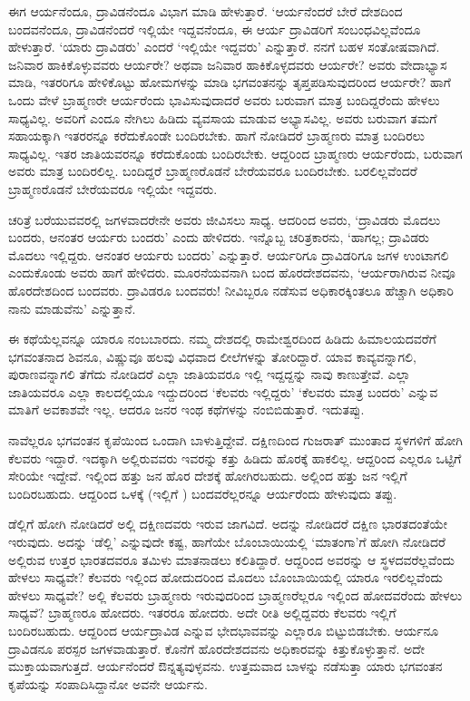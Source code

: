 ಈಗ ಆರ್ಯನೆಂದೂ, ದ್ರಾವಿಡನೆಂದೂ ವಿಭಾಗ ಮಾಡಿ ಹೇಳುತ್ತಾರೆ. `ಆರ್ಯನೆಂದರೆ ಬೇರೆ ದೇಶದಿಂದ ಬಂದವನೆಂದೂ, ದ್ರಾವಿಡನೆಂದರೆ ಇಲ್ಲಿಯೇ ಇದ್ದವನೆಂದೂ, ಈ ಆರ್ಯ ದ್ರಾವಿಡರಿಗೆ ಸಂಬಂಧವಿಲ್ಲವೆಂದೂ ಹೇಳುತ್ತಾರೆ. `ಯಾರು ದ್ರಾವಿಡರು' ಎಂದರೆ  `ಇಲ್ಲಿಯೇ ಇದ್ದವರು'  ಎನ್ನುತ್ತಾರೆ. ನನಗೆ ಬಹಳ ಸಂತೋಷವಾಗಿದೆ. ಜನಿವಾರ ಹಾಕಿಕೊಳ್ಳುವವರು ಆರ್ಯರೇ? ಅಥವಾ ಜನಿವಾರ ಹಾಕಿಕೊಳ್ಳದವರು ಆರ್ಯರೇ? ಅವರು ವೇದಾಭ್ಯಾಸ ಮಾಡಿ, ಇತರರಿಗೂ ಹೇಳಿಕೊಟ್ಟು ಹೋಮಗಳನ್ನು ಮಾಡಿ ಭಗವಂತನನ್ನು ತೃಪ್ತಪಡಿಸುವುದರಿಂದ ಆರ್ಯರೇ? ಹಾಗೆ ಒಂದು ವೇಳೆ ಬ್ರಾಹ್ಮಣರೇ ಆರ್ಯರೆಂದು ಭಾವಿಸುವುದಾದರೆ ಅವರು ಬರುವಾಗ ಮಾತ್ರ ಬಂದಿದ್ದರೆಂದು ಹೇಳಲು ಸಾಧ್ಯವಿಲ್ಲ. ಅವರಿಗೆ ಎಂದೂ ನೇಗಿಲು ಹಿಡಿದು ವ್ಯವಸಾಯ ಮಾಡುವ ಅಭ್ಯಾಸವಿಲ್ಲ. ಅವರು ಬರುವಾಗ ತಮಗೆ ಸಹಾಯಕ್ಕಾಗಿ ಇತರರನ್ನೂ ಕರೆದುಕೊಂಡೇ ಬಂದಿರಬೇಕು. ಹಾಗೆ ನೋಡಿದರೆ ಬ್ರಾಹ್ಮಣರು ಮಾತ್ರ ಬಂದಿರಲು ಸಾಧ್ಯವಿಲ್ಲ. ಇತರ ಜಾತಿಯವರನ್ನೂ ಕರೆದುಕೊಂಡು ಬಂದಿರಬೇಕು. ಆದ್ದರಿಂದ ಬ್ರಾಹ್ಮಣರು ಆರ್ಯರೆಂದು, ಬರುವಾಗ ಅವರು ಮಾತ್ರ ಬಂದಿರಲಿಲ್ಲ. ಬಂದಿದ್ದರೆ ಬ್ರಾಹ್ಮಣರೊಡನೆ ಬೇರೆಯವರೂ ಬಂದಿರಬೇಕು. ಬರಲಿಲ್ಲವೆಂದರೆ ಬ್ರಾಹ್ಮಣರೊಡನೆ ಬೇರೆಯವರೂ ಇಲ್ಲಿಯೇ ಇದ್ದವರು.

ಚರಿತ್ರೆ ಬರೆಯುವವರಲ್ಲಿ ಜಗಳವಾದರೇನೇ ಅವರು ಜೀವಿಸಲು ಸಾಧ್ಯ. ಆದರಿಂದ ಅವರು, `ದ್ರಾವಿಡರು ಮೊದಲು ಬಂದರು, ಆನಂತರ ಆರ್ಯರು ಬಂದರು' ಎಂದು ಹೇಳಿದರು. ಇನ್ನೊಬ್ಬ ಚರಿತ್ರಕಾರನು, `ಹಾಗಲ್ಲ; ದ್ರಾವಿಡರು ಮೊದಲು ಇಲ್ಲಿದ್ದರು. ಆನಂತರ ಆರ್ಯರು ಬಂದರು' ಎನ್ನುತ್ತಾರೆ. ಆರ್ಯರಿಗೂ ದ್ರಾವಿಡರಿಗೂ ಜಗಳ ಉಂಟಾಗಲಿ ಎಂದುಕೊಂಡು ಅವರು ಹಾಗೆ ಹೇಳಿದರು. ಮೂರನೆಯವನಾಗಿ ಬಂದ ಹೊರದೇಶದವನು, `ಆರ್ಯರಾಗಿರುವ ನೀವೂ ಹೊರದೇಶದಿಂದ ಬಂದವರು. ದ್ರಾವಿಡರೂ ಬಂದವರು! ನೀವಿಬ್ಬರೂ ನಡೆಸುವ ಅಧಿಕಾರಕ್ಕಿಂತಲೂ ಹೆಚ್ಚಾಗಿ ಅಧಿಕಾರಿ ನಾನು ಮಾಡುವೆನು' ಎನ್ನುತ್ತಾನೆ.

ಈ ಕಥೆಯೆಲ್ಲವನ್ನೂ ಯಾರೂ ನಂಬಬಾರದು. ನಮ್ಮ ದೇಶದಲ್ಲಿ ರಾಮೇಶ್ವರದಿಂದ ಹಿಡಿದು ಹಿಮಾಲಯದವರೆಗೆ ಭಗವಂತನಾದ ಶಿವನೂ, ವಿಷ್ಣುವೂ ಹಲವು ವಿಧವಾದ ಲೀಲೆಗಳನ್ನು ತೋರಿದ್ದಾರೆ. ಯಾವ ಕಾವ್ಯವನ್ನಾಗಲಿ, ಪುರಾಣವನ್ನಾಗಲಿ ತೆಗೆದು ನೋಡಿದರೆ ಎಲ್ಲಾ ಜಾತಿಯವರೂ ಇಲ್ಲಿ ಇದ್ದದ್ದನ್ನು ನಾವು ಕಾಣುತ್ತೇವೆ. ಎಲ್ಲಾ ಜಾತಿಯವರೂ ಎಲ್ಲಾ ಕಾಲದಲ್ಲಿಯೂ ಇದ್ದುದರಿಂದ `ಕೆಲವರು ಇಲ್ಲಿದ್ದರು' `ಕೆಲವರು ಮಾತ್ರ ಬಂದರು' ಎನ್ನುವ ಮಾತಿಗೆ ಅವಕಾಶವೇ ಇಲ್ಲ. ಆದರೂ ಜನರ ಇಂಥ ಕಥೆಗಳನ್ನು ನಂಬಿಬಿಡುತ್ತಾರೆ. ಇದುತಪ್ಪು. 

ನಾವೆಲ್ಲರೂ ಭಗವಂತನ ಕೃಪೆಯಿಂದ ಒಂದಾಗಿ ಬಾಳುತ್ತಿದ್ದೇವೆ. ದಕ್ಷಿಣದಿಂದ ಗುಜರಾತ್ ಮುಂತಾದ ಸ್ಥಳಗಳಿಗೆ ಹೋಗಿ ಕೆಲವರು ಇದ್ದಾರೆ. ಇದಕ್ಕಾಗಿ ಅಲ್ಲಿರುವವರು ಇವರನ್ನು ಕತ್ತು ಹಿಡಿದು ಹೊರಕ್ಕೆ ಹಾಕಲಿಲ್ಲ. ಆದ್ದರಿಂದ ಎಲ್ಲರೂ ಒಟ್ಟಿಗೆ ಸೇರಿಯೇ ಇದ್ದೇವೆ. ಇಲ್ಲಿಂದ ಹತ್ತು ಜನ ಹೊರ ದೇಶಕ್ಕೆ ಹೋಗಿರಬಹುದು. ಅಲ್ಲಿಂದ ಹತ್ತು ಜನ ಇಲ್ಲಿಗೆ ಬಂದಿರಬಹುದು. ಆದ್ದರಿಂದ ಒಳಕ್ಕೆ (ಇಲ್ಲಿಗೆ ) ಬಂದವರೆಲ್ಲರನ್ನೂ ಆರ್ಯರೆಂದು ಹೇಳುವುದು ತಪ್ಪು. 

ಡೆಲ್ಲಿಗೆ ಹೋಗಿ ನೋಡಿದರೆ ಅಲ್ಲಿ ದಕ್ಷಿಣದವರು ಇರುವ ಜಾಗವಿದೆ. ಅದನ್ನು ನೋಡಿದರೆ ದಕ್ಷಿಣ ಭಾರತದಂತೆಯೇ ಇರುವುದು. ಅದನ್ನು `ಡೆಲ್ಲಿ' ಎನ್ನುವುದೇ ಕಷ್ಟ, ಹಾಗೆಯೇ ಬೊಂಬಾಯಿಯಲ್ಲಿ `ಮಾತಂಗಾ'ಗೆ ಹೋಗಿ ನೋಡಿದರೆ ಅಲ್ಲಿರುವ ಉತ್ತರ ಭಾರತದವರೂ ತಮಿಳು ಮಾತನಾಡಲು ಕಲಿತಿದ್ದಾರೆ. ಆದ್ದರಿಂದ ಅವರನ್ನು ಆ ಸ್ಥಳದವರೆಲ್ಲವೆಂದು ಹೇಳಲು ಸಾಧ್ಯವೇ? ಕೆಲವರು ಇಲ್ಲಿಂದ ಹೋದುದರಿಂದ ಮೊದಲು ಬೊಂಬಾಯಿಯಲ್ಲಿ ಯಾರೂ ಇರಲಿಲ್ಲವೆಂದು ಹೇಳಲು ಸಾಧ್ಯವೇ? ಅಲ್ಲಿ ಕೆಲವರು ಬ್ರಾಹ್ಮಣರು ಇರುವುದರಿಂದ ಬ್ರಾಹ್ಮಣರೆಲ್ಲರೂ ಇಲ್ಲಿಂದ ಹೋದವರೆಂದು ಹೇಳಲು ಸಾಧ್ಯವೆ? ಬ್ರಾಹ್ಮಣರೂ ಹೋದರು. ಇತರರೂ ಹೋದರು. ಅದೇ ರೀತಿ ಅಲ್ಲಿದ್ದವರು ಕೆಲವರು ಇಲ್ಲಿಗೆ ಬಂದಿರಬಹುದು. ಆದ್ದರಿಂದ ಆರ್ಯದ್ರಾವಿಡ ಎನ್ನುವ ಭೇದಭಾವವನ್ನು ಎಲ್ಲಾರೂ ಬಿಟ್ಟುಬಿಡಬೇಕು. ಆರ್ಯನೂ ದ್ರಾವಿಡನೂ ಪರಸ್ಪರ ಜಗಳವಾಡುತ್ತಾರೆ. ಕೊನೆಗೆ ಹೊರದೇಶದವನು ಅಧಿಕಾರವನ್ನು ಕಿತ್ತುಕೊಳ್ಳುತ್ತಾನೆ. ಅದೇ ಮುಕ್ತಾಯವಾಗುತ್ತದೆ. ಆರ್ಯನೆಂದರೆ ಔನ್ನತ್ಯವುಳ್ಳವನು. ಉತ್ತಮವಾದ ಬಾಳನ್ನು ನಡೆಸುತ್ತಾ ಯಾರು ಭಗವಂತನ ಕೃಪೆಯನ್ನು ಸಂಪಾದಿಸಿದ್ದಾನೋ ಅವನೇ ಆರ್ಯನು. 

